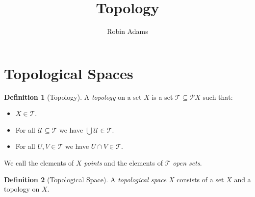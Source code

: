 \documentclass{article}
\title{Topology}
\author{Robin Adams}
\theoremstyle{definition}
\newtheorem{df}{Definition}
\newcommand{\pow}{\ensuremath{\mathcal{P}}}
\newcommand{\TT}{\ensuremath{\mathcal{T}}}
\newcommand{\UU}{\ensuremath{\mathcal{U}}}
\begin{document}
\maketitle

\section{Topological Spaces}

\begin{df}[Topology]
    A \emph{topology} on a set $X$ is a set $\TT \subseteq \pow X$ such that:
    \begin{itemize}
        \item $X \in \TT$.
        \item For all $\UU \subseteq \TT$ we have $\bigcup \UU \in \TT$.
        \item For all $U, V \in \TT$ we have $U \cap V \in \TT$.
    \end{itemize}
    We call the elements of $X$ \emph{points} and the elements of $\TT$ \emph{open sets}.
\end{df}

\begin{df}[Topological Space]
    A \emph{topological space} $X$ consists of a set $X$ and a topology on $X$.
\end{df}
\end{document}
